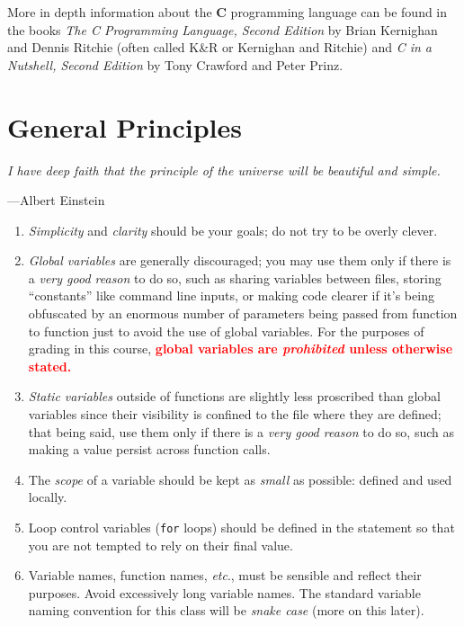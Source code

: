 \documentclass[11pt]{article}
\begin{document}
More in depth information about the \textbf{C} programming language can
be found in the books \emph{The C Programming Language, Second Edition}
by Brian Kernighan and Dennis Ritchie (often called K\&R or Kernighan
and Ritchie) and \emph{C in a Nutshell, Second Edition} by Tony Crawford
and Peter Prinz.

\section{General Principles}

\textwidth
\epigraph{\emph{I have deep faith that the principle of the universe will be
beautiful and simple.}}{---Albert Einstein}\noindent

\begin{enumerate}
  \item \emph{Simplicity} and \emph{clarity} should be your goals; do not try to
    be overly clever.

  \item \emph{Global variables} are generally discouraged; you may use
    them only if there is a \emph{very good reason} to do so, such as
    sharing variables between files, storing ``constants'' like command
    line inputs, or making code clearer if it's being obfuscated by an
    enormous number of parameters being passed from function to function
    just to avoid the use of global variables. For the purposes of
    grading in this course, \textcolor{red}{\textbf{global variables are
    \emph{prohibited} unless otherwise stated.}}

  \item \emph{Static variables} outside of functions are slightly less
    proscribed than global variables since their visibility is confined to the
    file where they are defined; that being said, use them only if there is a
    \emph{very good reason} to do so, such as making a value persist across
    function calls.

  \item The \emph{scope} of a variable should be kept as \emph{small} as possible:
    defined and used locally.

  \item Loop control variables (\texttt{for} loops) should be defined in the
    statement so that you are not tempted to rely on their final value.

  \item Variable names, function names, \emph{etc}., must be sensible and
    reflect their purposes. Avoid excessively long variable names. The standard
    variable naming convention for this class will be \emph{snake case} (more on
    this later).


\end{enumerate}
\end{document}

